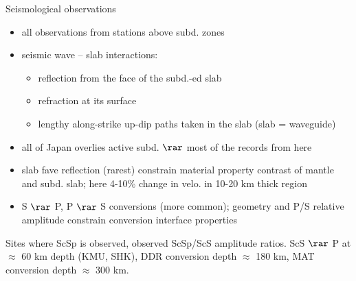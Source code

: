 \documentclass[aspectratio=169]{beamer}
\begin{document}
\begin{frame}{\SubdLithoVelo}
    Seismological observations
    
    \begin{itemize}
        \item all observations from stations above subd. zones
        \item seismic wave -- slab interactions:
        \begin{itemize}
            \item reflection from the face of the subd.-ed slab
            \item refraction at its surface
            \item lengthy along-strike up-dip paths taken in the slab (slab = waveguide)
        \end{itemize}
        \item all of Japan overlies active subd. $\rar$ most of the records from here
        \item slab fave reflection (rarest) constrain material property contrast of mantle and subd. slab; here 4-10\% change in velo. in 10-20 km thick region
        \item S $\rar$ P, P $\rar$ S conversions (more common); geometry and P/S relative amplitude constrain conversion interface properties
    \end{itemize}
\end{frame}

\begin{frame}{\SubdLithoVelo}
    \begin{minipage}[c]{0.325\textwidth}
    \end{minipage}
    \hspace{10pt}
    \begin{minipage}[c]{0.6\textwidth}
        Sites where ScSp is observed, observed ScSp/ScS amplitude ratios. ScS $\rar$ P at $\approx$ 60 km depth (KMU, SHK), DDR conversion depth $\approx$ 180 km, MAT conversion depth $\approx$ 300 km.
    \end{minipage}
\end{frame}
\end{document}
